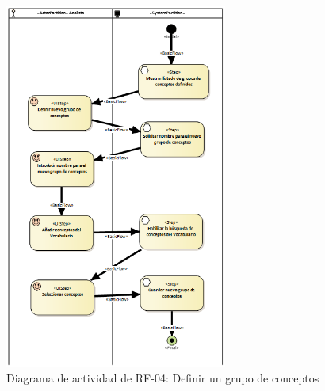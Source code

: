 \begin{figure}[H]
    \centering
    \includegraphics[width=0.65\textwidth]{figures/FR04.png}
    \caption{Diagrama de actividad de RF-04: Definir un grupo de conceptos}
    \label{fig:FR04}
\end{figure}


